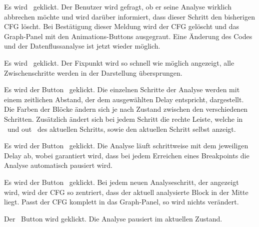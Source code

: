 {Es wird \faStop\ geklickt.}
{Der Benutzer wird gefragt, ob er seine Analyse wirklich abbrechen möchte und wird darüber informiert, dass dieser Schritt den bisherigen CFG löscht. Bei Bestätigung dieser Meldung wird der CFG gelöscht und das Graph-Panel mit den Animations-Buttons ausgegraut. Eine Änderung des Codes und der Datenflussanalyse ist jetzt wieder möglich.}



{Es wird \faPlay\ geklickt.}
{Der Fixpunkt wird so schnell wie möglich angezeigt, alle Zwischenschritte werden in der Darstellung übersprungen.}

{Es wird der Button \faPlay\ geklickt.}
{Die einzelnen Schritte der Analyse werden mit einem zeitlichen Abstand, der dem ausgewählten Delay entspricht, dargestellt. Die Farben der Blöcke ändern sich je nach Zustand zwischen den verschiedenen Schritten. Zusätzlich ändert sich bei jedem Schritt die rechte Leiste, welche \glqq in \grqq\ und \glqq out \grqq\ des aktuellen Schritts, sowie den aktuellen Schritt selbst anzeigt.}

{Es wird der Button \faPlay\ geklickt.}
{Die Analyse läuft schrittweise mit dem jeweiligen Delay ab, wobei garantiert wird, dass bei jedem Erreichen eines Breakpoints die Analyse automatisch pausiert wird.}

{Es wird der Button \faPlay\ geklickt.}
{Bei jedem neuen Analyseschritt, der angezeigt wird, wird der CFG so zentriert, dass der aktuell analysierte Block in der Mitte liegt. Passt der CFG komplett in das Graph-Panel, so wird nichts verändert.}




{Der \faPause\ Button wird geklickt.}
{Die Analyse pausiert im aktuellen Zustand.}

